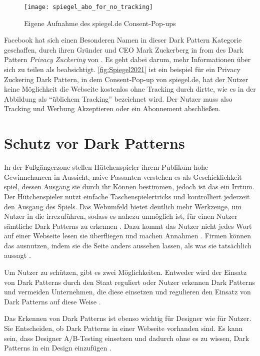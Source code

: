 \documentclass[conference,compsoc,final,a4paper]{IEEEtran}
\begin{document}
\begin{figure}[!ht]
  \centering
  \texttt{[image: spiegel\_abo\_for\_no\_tracking]}
  \caption{Eigene Aufnahme des spiegel.de Consent-Pop-ups~\autocite{Spiegel2021}}
  \label{fig:Spiegel2021}
\end{figure}

Facebook hat sich einen Besonderen Namen in dieser Dark Pattern Kategorie geschaffen, durch ihren Gründer und CEO Mark Zuckerberg in from des Dark Pattern \textit{Privacy Zuckering} von \citeauthor{Brignull} \autocite{Brignull}. Es geht dabei darum, mehr Informationen über sich zu teilen als beabsichtigt. \autoref{fig:Spiegel2021} ist ein beispiel für ein Privacy Zuckering Dark Pattern, in dem Consent-Pop-up von spiegel.de, hat der Nutzer keine Möglichkeit die Webseite kostenlos ohne Tracking durch dirtte, wie es in der Abbildung als \enquote{üblichem Tracking} bezeichnet wird. Der Nutzer muss also Tracking und Werbung Akzeptieren oder ein Abonnement abschließen. 


\section{Schutz vor Dark Patterns}
In der Fußgängerzone stellen Hütchenspieler ihrem Publikum hohe Gewinnchancen in Aussicht, naive Passanten verstehen es als Geschicklichkeit spiel, dessen Ausgang sie durch ihr Können bestimmen, jedoch ist das ein Irrtum. Der Hütchenspieler nutzt einfache Taschenspielertricks und kontrolliert jederzeit den Ausgang des Spiels. Das Webumfeld bietet deutlich mehr Werkzeuge, um Nutzer in die irrezuführen, sodass es nahezu unmöglich ist, für einen Nutzer sämtliche Dark Patterns zu erkennen \autocite{M.Bhoot2020}. Dazu kommt das Nutzer nicht jedes Wort auf einer Webseite lesen sie überfliegen und machen Annahmen \autocite{Brignull}. Firmen können das ausnutzen, indem sie die Seite anders aussehen lassen, als was sie tatsächlich aussagt \autocite{Brignull}.

Um Nutzer zu schützen, gibt es zwei Möglichkeiten. Entweder wird der Einsatz von Dark Patterns durch den Staat reguliert oder Nutzer erkennen Dark Patterns und vermeiden Unternehmen, die diese einsetzen und regulieren den Einsatz von Dark Patterns auf diese Weise \autocite{Narayanan2020}.

Das Erkennen von Dark Patterns ist ebenso wichtig für Designer wie für Nutzer. Sie Entscheiden, ob Dark Patterns in einer Webseite vorhanden sind. Es kann sein, dass Designer A/B-Testing einsetzen und dadurch ohne es zu wissen, Dark Patterns in ein Design einzufügen \autocite{Narayanan2020}.
\end{document}
